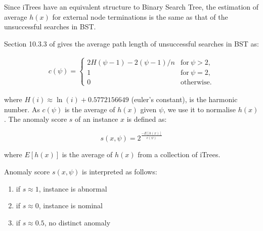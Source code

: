 Since iTrees have an equivalent structure to Binary Search Tree, the estimation of average $h(x)$ for external node terminations is the same as that of the unsuccessful searches in BST.

Section 10.3.3 of \cite{10.5555/289373} gives the average path length of unsuccessful searches
in BST as:

\vspace{-2em}
\begin{equation}
    \label{eq:average-path-length-of-unsuccessful-searches-bst}
    \begin{split}
        c(\psi) =  \left\{
        \begin{matrix}
            2H(\psi -1) - 2(\psi -1)/n & \text{for}\: \psi>2,\\
            1 &  \text{for}\: \psi=2,\\
            0 & \text{otherwise.}
        \end{matrix}\right.
    \end{split}
\end{equation}

where $H(i) \approx \ln(i) + 0.5772156649$  (euler's constant), is the harmonic number. As $c(\psi)$ is the average of $h(x)$ given $\psi$, we use it to normalise $h(x)$.
The anomaly score $s$ of an instance $x$ is defined as:

\begin{equation}
    \label{eq:iforest-anomaly-score-for-an-instance}
    s(x,\psi) = 2^{\frac{-E[h(x)]}{c(\psi)}}
\end{equation}

where $E[h(x)]$ is the average of $h(x)$ from a collection of iTrees. 

Anomaly score $s(x,\psi)$ is interpreted as follows:

\begin{enumerate}
    \vspace{-1em}
    \setlength\itemsep{-1em}
    \item if $s \approx 1$, instance is abnormal
    \item if $s \approx 0$, instance is nominal
    \item if $s \approx 0.5$, no distinct anomaly
\end{enumerate}


